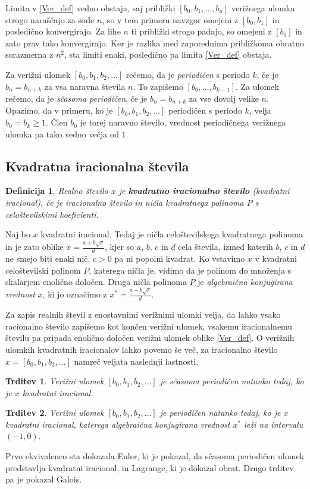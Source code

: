 \documentclass[a4paper,12pt]{article}
\newtheorem{trditev}{Trditev}
\newtheorem{definicija}{Definicija}
\begin{document}
Limita v \eqref{Ver_def} vedno obstaja, saj približki $[b_0, b_1, \ldots, b_n]$ verižnega ulomka strogo naraščajo za sode $n$, so v tem primeru navzgor omejeni z $[b_0, b_1]$ in posledično konvergirajo. Za lihe $n$ ti približki strogo padajo, so omejeni z $[b_0]$ in zato prav tako konvergirajo. Ker je razlika med zaporednima približkoma obratno sorazmerna z $n^2$, sta limiti enaki, posledično pa limita \eqref{Ver_def} obstaja. 

Za verižni ulomek $[b_0, b_1, b_2, \ldots]$ rečemo, da je \emph{periodičen} s periodo $k$, če je $b_n = b_{n+k}$ za vsa naravna števila $n$. To zapišemo $\overline{[b_0, \ldots, b_{k-1}]}$.
Za ulomek rečemo, da je \emph{sčasoma periodičen}, če je $b_n = b_{n+k}$ za vse dovolj velike $n$. Opazimo, da v primeru, ko je $[b_0, b_1, b_2, \ldots]$ periodičen s periodo $k$, velja $b_0 = b_k \geq 1$. Člen $b_0$ je torej naravno število, vrednost periodičnega verižnega ulomka pa tako vedno večja od $1$. 


\subsection{Kvadratna iracionalna števila}

\begin{definicija}
	Realno število $x$ je \textbf{kvadratno iracionalno število} (kvadratni iracional), če je iracionalno število in ničla kvadratnega polinoma $P$ s celoštevilskimi koeficienti.
\end{definicija}
Naj bo $x$ kvadratni iracional. Tedaj je ničla celoštevilskega kvadratnega polinoma in je zato oblike $x = \frac{a + b\sqrt{c}}{d}$, kjer so $a$, $b$, $c$ in $d$ cela števila, izmed katerih $b$, $c$ in $d$ ne smejo biti enaki nič, $c > 0$ pa ni popolni kvadrat. Ko vstavimo $x$ v kvadratni celoštevilski polinom $P$, katerega ničla je, vidimo da je polinom do množenja s skalarjem enolično določen.
Druga ničla polinoma $P$ je \emph{algebraična konjugirana vrednost} $x$, ki jo označimo z $x^* = \frac{a - b\sqrt{c}}{d}$.

Za zapis realnih števil z enostavnimi verižnimi ulomki velja, da lahko vsako racionalno število zapišemo kot končen verižni ulomek, vsakemu iracionalnemu številu pa pripada enolično določen verižni ulomek oblike \eqref{Ver_def}. O verižnih ulomkih kvadratnih iracionalov lahko povemo še več, za iracionalno število $x = [b_0, b_1, b_2, \ldots]$ namreč veljata naslednji lastnosti.
\begin{trditev}
    Verižni ulomek $[b_0, b_1, b_2, \ldots]$ je sčasoma periodičen natanko tedaj, ko je $x$ kvadratni iracional.
\end{trditev}
\begin{trditev}
    Verižni ulomek $[b_0, b_1, b_2, \ldots]$ je periodičen natanko tedaj, ko je $x$ kvadratni iracional, katerega algebraična konjugirana vrednost $x^*$ leži na intervalu $(-1, 0)$.
\end{trditev} 
Prvo ekvivalenco sta dokazala Euler, ki je pokazal, da sčasoma periodičen ulomek predstavlja kvadratni iracional, in Lagrange, ki je dokazal obrat. Drugo trditev pa je pokazal Galois.
\end{document}
